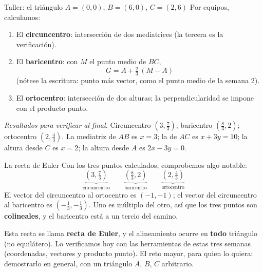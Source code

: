 \documentclass[aspectratio=169,10pt]{beamer}
\newcommand{\destaca}[1]{%
  \par\vspace{3pt}\noindent
  \colorbox{turquesaClaro}{%
    \parbox{\dimexpr\linewidth-2\fboxsep\relax}{\vspace{3pt}#1\vspace{3pt}}}%
  \par\vspace{3pt}}
\begin{document}
\begin{frame}{Taller: el triángulo $A=(0,0)$, $B=(6,0)$, $C=(2,6)$}
  Por equipos, calculamos:

  \vspace{0.2cm}
  \begin{enumerate}
    \item El \textbf{circuncentro}: intersección de dos mediatrices
      (la tercera es la verificación).
    \item El \textbf{baricentro}: con $M$ el punto medio de $BC$,
      \[
        G = A+\tfrac{2}{3}\,(M-A)
      \]
      (nótese la escritura: punto más vector, como el punto medio de la semana 2).
    \item El \textbf{ortocentro}: intersección de dos alturas; la
      perpendicularidad se impone con el producto punto.
  \end{enumerate}

  \vspace{0.3cm}
  \destaca{\small \textit{Resultados para verificar al final.}
  Circuncentro $\left(3,\tfrac{7}{3}\right)$; baricentro
  $\left(\tfrac{8}{3},2\right)$; ortocentro
  $\left(2,\tfrac{4}{3}\right)$. La mediatriz de $AB$ es $x=3$; la de
  $AC$ es $x+3y=10$; la altura desde $C$ es $x=2$; la altura desde $A$
  es $2x-3y=0$.}
\end{frame}
\begin{frame}{La recta de Euler}
  Con los tres puntos calculados, comprobemos algo notable:
  \[
    \underbrace{(3,\tfrac73)}_{\text{circuncentro}}\qquad
    \underbrace{(\tfrac83,2)}_{\text{baricentro}}\qquad
    \underbrace{(2,\tfrac43)}_{\text{ortocentro}}
  \]
  El vector del circuncentro al ortocentro es $(-1,-1)$; el vector del
  circuncentro al baricentro es $\left(-\tfrac13,-\tfrac13\right)$.
  Uno es múltiplo del otro, así que los tres puntos son
  \textbf{colineales}, y el baricentro está a un tercio del camino.

  \vspace{0.3cm}
  \destaca{Esta recta se llama \textbf{recta de Euler}, y el
  alineamiento ocurre en \textbf{todo} triángulo (no equilátero). Lo
  verificamos hoy con las herramientas de estas tres semanas
  (coordenadas, vectores y producto punto). El reto mayor, para quien
  lo quiera: demostrarlo en general, con un triángulo $A$, $B$, $C$
  arbitrario.}
\end{frame}
\end{document}
